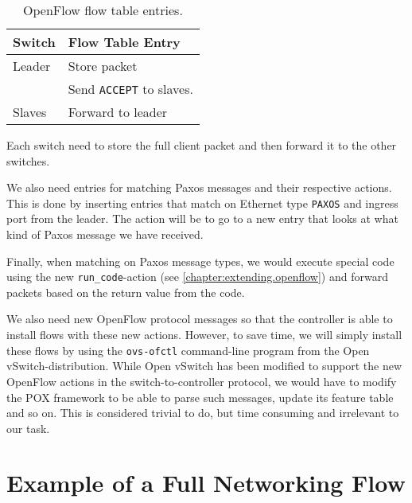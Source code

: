 \begin{table}[H]
  \centering
  \begin{tabular}{|l|l|}
    \hline
      \textbf{Switch} &
      \textbf{Flow Table Entry} \\

    \hline
      Leader & Store packet \\
             & Send \texttt{ACCEPT} to slaves. \\

    \hline
      Slaves & Forward to leader \\

    \hline
  \end{tabular}

  \caption{OpenFlow flow table entries.}
  \label{table:paxos.flowtable.entries}
\end{table}

Each switch need to store the full client packet and then
forward it to the other switches.

We also need entries for matching Paxos messages and their respective
actions.
%
This is done by inserting entries that match on Ethernet type
\texttt{PAXOS} and ingress port from the leader.
The action will be to go to a new entry that looks at what kind of Paxos
message we have received.

Finally, when matching on Paxos message types, we would execute 
special code using the new \texttt{run\_{}code}-action (see
    \vref{chapter:extending.openflow})
 and forward packets based on the return value from the code.

We also need new OpenFlow protocol messages so that the controller is able to install flows with these new
actions.
%
However, to save time, we will simply install these flows by using the
\texttt{ovs-ofctl} command-line program from the Open vSwitch-distribution.
%
While Open vSwitch has been modified to support the new OpenFlow actions in
the switch-to-controller protocol, we would have to modify the POX framework
to be able to parse such messages, update its feature table and so on.
%
This is considered trivial to do, but time consuming and irrelevant to our
task.



\section{Example of a Full Networking Flow}

